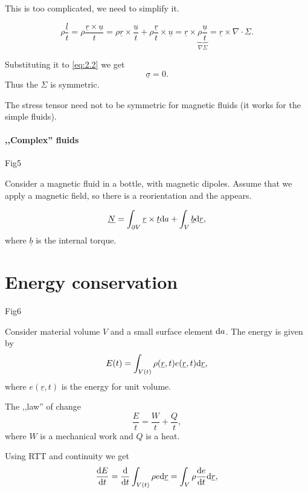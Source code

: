 \documentclass[11pt,oneside]{book}
\renewcommand{\vec}[1]{\underline{#1}}
\theoremstyle{definition} %
\theoremstyle{plain} %
\theoremstyle{remark} %
\theoremstyle{underline}
\begin{document}
  This is too complicated, we need to simplify it.
  
  \begin{displaymath}
    \rho \dfrac{ \vec l }{t} = \rho \dfrac{\vec r \times \vec u}{t} 
    = \rho \vec r \times \dfrac{\vec u}{t} + \rho \dfrac{ \vec r }{t} \times \vec u
    = \vec r \times \underbrace{\rho \dfrac{\vec u}{t}}_{\nabla \Sigma} 
    = \vec r \times \nabla \cdot \Sigma.
  \end{displaymath}

  Substituting it to  \ref{eq:2.2} we get
  \begin{displaymath}
    \vec \sigma = 0.
  \end{displaymath}
  Thus the $\Sigma $ is symmetric.

  The stress tensor need not to be symmetric for magnetic fluids (it works for the simple fluids).


  \paragraph{,,Complex'' fluids}
  \todo Fig5

  Consider a magnetic fluid in a bottle, with magnetic dipoles.
  Assume that we apply a magnetic field, so there is a reorientation and the  appears.
  
  \begin{displaymath}
    \vec N = \int_{\partial V} \vec r \times \vec t \d a + \int_{V} \vec b \d \vec r,
  \end{displaymath}
  where $\vec b$ is the internal torque.
  
  
  \section{Energy conservation}
  \todo Fig6 

  Consider material volume $V$ and a small surface element $\mathrm{d} a$.
  The energy is given by 
  \begin{displaymath}
    E(t) = \int_{V (t)} \rho (\vec r ,t ) e (\vec r, t) \d \vec r ,
  \end{displaymath}
  where $e (\vec r, t)$ is the energy for unit volume.

  The ,,law'' of change
  \begin{displaymath}
    \dfrac{E}{t} = \dfrac{W}{t} + \dfrac{Q}{t},
  \end{displaymath}
  where $W$ is a mechanical work and $Q$ is a heat.

  Using RTT and continuity we get
  \begin{displaymath}
    \dfrac{E}{t} = \dfrac{}{t} \int_{V(t)} \rho e \d \vec r = \int_V \rho \dfrac{e}{t} \d \vec r,
  \end{displaymath}
  
\end{document}
